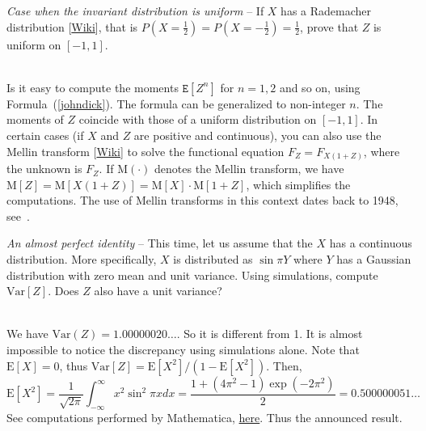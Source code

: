 \documentclass[oneside,10pt]{book}
\begin{document}
\begin{Exercise}\label{paasweqasde} {\em Case when the invariant distribution is uniform} -- If 
 $X$ has a \textcolor{index}{Rademacher distribution} [\href{https://en.wikipedia.org/wiki/Rademacher_distribution}{Wiki}], that is $P(X=\frac{1}{2}) =
 P(X=-\frac{1}{2}) =\frac{1}{2}$, prove that $Z$ is uniform on $[-1, 1]$.
\vspace{1ex}

 \\
Is it easy to compute the moments $\texttt{E}[Z^n]$ for $n=1,2$ and so on, using
Formula~(\ref{johndick}). The formula can be generalized to non-integer $n$. The moments of $Z$ coincide with those of a uniform distribution on $[-1, 1]$.
In certain cases (if $X$ and $Z$ are positive and continuous), 
you can also use the \textcolor{index}{Mellin transform} [\href{https://en.wikipedia.org/wiki/Mellin_transform}{Wiki}] 
to solve the functional equation $F_Z = F_{X(1+Z)}$, where the unknown is $F_Z$.
If $\text{M}(\cdot)$ denotes the Mellin transform, we have $\text{M}[Z] =\text{M}[X(1+Z)] = \text{M}[X]\cdot \text{M}[1+Z]$, which simplifies
 the computations. The use of Mellin transforms in this context dates back to 1948, see~\cite{mellin48}.
\end{Exercise}

\begin{Exercise}\label{p} {\em An almost perfect identity} -- This time, let us assume that the $X$ has a continuous distribution.
More specifically,  $X$ is distributed as $\sin\pi Y$ where $Y$ has a Gaussian distribution with zero mean and unit variance. 
Using simulations, compute $\text{Var}[Z]$. Does $Z$ also have a unit variance?
\vspace{1ex}

 \\
We have $\text{Var}(Z) = 1.00000020\dots$. So it is different from 1. It is almost impossible to notice the discrepancy
 using simulations alone. Note that $\text{E}[X] = 0$, thus $\text{Var}[Z] = \text{E}[X^2] / (1 - \text{E}[X^2])$.  Then,
$$
\text{E}[X^2] =\frac{1}{\sqrt{2\pi}}\int_{-\infty}^\infty x^2 \sin^2 \pi x dx
 = \frac{1+(4\pi^2 - 1)\exp(-2\pi^2)}{2}
= 0.500000051\dots
$$
See computations performed by Mathematica, \href{https://mltblog.com/3JqDagR}{here}. Thus the announced result.
\end{Exercise}
\end{document}

